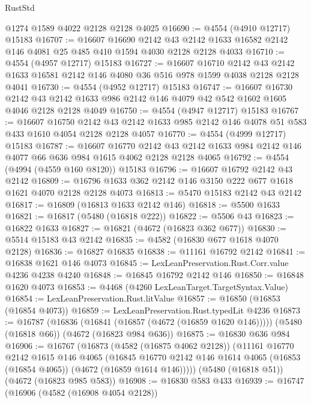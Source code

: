 \begin{lexlean}{RustStd}
\begin{coremodule}
    @1274
    @1589
    @4022
    @2128
    @2128
    @4025
@16690 := @4554 (@4910 @12717) @15183
@16707 := @16607
    @16690
    @2142
    @43
    @2142
    @1633
    @16582
    @2142
    @146
    @4081
    @25
    @485
    @410
    @1594
    @4030
    @2128
    @2128
    @4033
@16710 := @4554 (@4957 @12717) @15183
@16727 := @16607
    @16710
    @2142
    @43
    @2142
    @1633
    @16581
    @2142
    @146
    @4080
    @36
    @516
    @978
    @1599
    @4038
    @2128
    @2128
    @4041
@16730 := @4554 (@4952 @12717) @15183
@16747 := @16607
    @16730
    @2142
    @43
    @2142
    @1633
    @986
    @2142
    @146
    @4079
    @42
    @542
    @1602
    @1605
    @4046
    @2128
    @2128
    @4049
@16750 := @4554 (@4947 @12717) @15183
@16767 := @16607
    @16750
    @2142
    @43
    @2142
    @1633
    @985
    @2142
    @146
    @4078
    @51
    @583
    @433
    @1610
    @4054
    @2128
    @2128
    @4057
@16770 := @4554 (@4999 @12717) @15183
@16787 := @16607
    @16770
    @2142
    @43
    @2142
    @1633
    @984
    @2142
    @146
    @4077
    @66
    @636
    @984
    @1615
    @4062
    @2128
    @2128
    @4065
@16792 := @4554 (@4994 (@4559 @160 @8120)) @15183
@16796 := @16607 @16792 @2142 @43 @2142
@16809 := @16796 @1633 @362 @2142 @146 @3150 @222 @677 @1618 @1621 @4070 @2128 @2128 @4073
@16813 := @5470 @15183 @2142 @43 @2142
@16817 := @16809 (@16813 @1633 @2142 @146)
@16818 := @5500 @1633
@16821 := @16817 (@5480 (@16818 @222))
@16822 := @5506 @43
@16823 := @16822 @1633
@16827 := @16821 (@4672 (@16823 @362 @677))
@16830 := @5514 @15183 @43 @2142
@16835 := @4582 (@16830 @677 @1618 @4070 @2128)
@16836 := @16827 @16835
@16838 := @11161 @16792 @2142
@16841 := @16838 @1621 @146 @4073
@16845 := LexLeanPreservation.Rust.Corr.value @4236 @4238 @4240
@16848 := @16845 @16792 @2142 @146
@16850 := @16848 @1620 @4073
@16853 := @4468 (@4260 LexLeanTarget.TargetSyntax.Value)
@16854 := LexLeanPreservation.Rust.litValue
@16857 := @16850 (@16853 (@16854 @4073))
@16859 := LexLeanPreservation.Rust.typedLit @4236
@16873 := @16787
    (@16836 (@16841 (@16857 (@4672 (@16859 @1620 @146)))))
    (@5480 (@16818 @66))
    (@4672 (@16823 @984 @636))
@16875 := @16830 @636 @984
@16906 := @16767
    (@16873
      (@4582 (@16875 @4062 @2128))
      (@11161
        @16770
        @2142
        @1615
        @146
        @4065
        (@16845 @16770 @2142 @146 @1614 @4065 (@16853 (@16854 @4065)) (@4672 (@16859 @1614 @146)))))
    (@5480 (@16818 @51))
    (@4672 (@16823 @985 @583))
@16908 := @16830 @583 @433
@16939 := @16747
    (@16906
      (@4582 (@16908 @4054 @2128))

\end{coremodule}
\end{lexlean}
